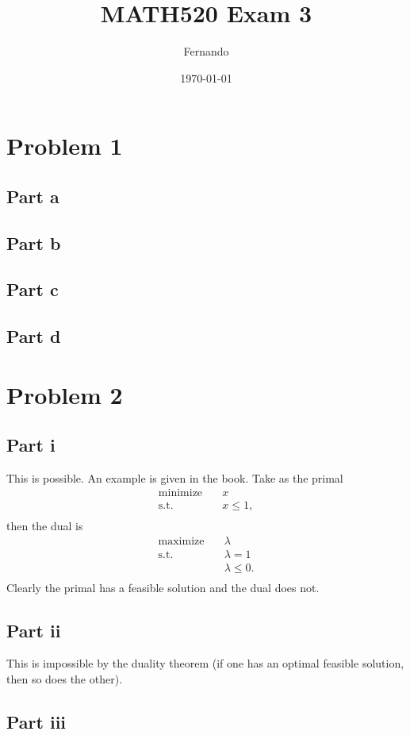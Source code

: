 \documentclass{article}
\begin{document}
\title{MATH520 Exam 3}
\author{Fernando}
\date{\today}
\maketitle

\section*{Problem 1}
\subsection*{Part a}
\subsection*{Part b}
\subsection*{Part c}
\subsection*{Part d}
\section*{Problem 2}
\subsection*{Part i}
This is possible. An example is given in the book. Take as the primal
\[
\begin{aligned}
\text{minimize}\quad & x\\
\textrm{s.t.} \quad &x\leq 1,\\
\end{aligned}
\]
then the dual is
\[
\begin{aligned}
\text{maximize}\quad & \lambda\\
\textrm{s.t.} \quad &\lambda= 1\\
\quad &\lambda\leq 0.\\
\end{aligned}
\]
Clearly the primal has a feasible solution and the dual does not.
\subsection*{Part ii}
This is impossible by the duality theorem (if one has an optimal feasible
solution, then so does the other).
\subsection*{Part iii}
\end{document}
